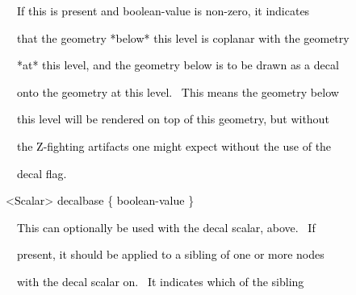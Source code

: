\documentclass[a4paper]{article}
\newcommand\textstyleOOoComputerKeyWord[1]{\textrm{\textcolor[rgb]{0.0,0.0,0.5019608}{#1}}}
\newcommand\textstyleOOoAssemblerSpecialChar[1]{\textrm{\textcolor[rgb]{0.0,0.5019608,0.0}{#1}}}
\newcommand\textstyleOOoAssemblerIdent[1]{\textrm{\textcolor{black}{#1}}}
\begin{document}
\bigskip

{\color{black}
\textstyleOOoComputerKeyWord{\textcolor{black}{\ \ \ \ If this is present and boolean-value is non-zero, it indicates}}}

{\color{black}
\textstyleOOoComputerKeyWord{\textcolor{black}{\ \ \ \ that the geometry *below* this level is coplanar with the
geometry}}}

{\color{black}
\textstyleOOoComputerKeyWord{\textcolor{black}{\ \ \ \ *at* this level, and the geometry below is to be drawn as a
decal}}}

{\color{black}
\textstyleOOoComputerKeyWord{\textcolor{black}{\ \ \ \ onto the geometry at this level. \ This means the geometry
below}}}

{\color{black}
\textstyleOOoComputerKeyWord{\textcolor{black}{\ \ \ \ this level will be rendered {\textquotedbl}on top
of{\textquotedbl} this geometry, but without}}}

{\color{black}
\textstyleOOoComputerKeyWord{\textcolor{black}{\ \ \ \ the Z-fighting artifacts one might expect without the use of
the}}}

{\color{black}
\textstyleOOoComputerKeyWord{\textcolor{black}{\ \ \ \ decal flag.}}}


\bigskip

{\color{black}
\textstyleOOoComputerKeyWord{\textcolor{black}{\ \ }}\textstyleOOoAssemblerSpecialChar{{\textless}}\textstyleOOoAssemblerIdent{Scalar}\textstyleOOoAssemblerSpecialChar{{\textgreater}}\textstyleOOoComputerKeyWord{\textcolor{black}{
}}\textstyleOOoAssemblerIdent{decalbase}\textstyleOOoComputerKeyWord{\textcolor{black}{
}}\textstyleOOoAssemblerSpecialChar{\{}\textstyleOOoComputerKeyWord{\textcolor{black}{
}}\textstyleOOoAssemblerIdent{boolean}\textstyleOOoAssemblerSpecialChar{{}-}\textstyleOOoAssemblerIdent{value}\textstyleOOoComputerKeyWord{\textcolor{black}{
}}\textstyleOOoAssemblerSpecialChar{\}}}


\bigskip

{\color{black}
\textstyleOOoComputerKeyWord{\textcolor{black}{\ \ \ \ This can optionally be used with the
{\textquotedbl}decal{\textquotedbl} scalar, above. \ If}}}

{\color{black}
\textstyleOOoComputerKeyWord{\textcolor{black}{\ \ \ \ present, it should be applied to a sibling of one or more
nodes}}}

{\color{black}
\textstyleOOoComputerKeyWord{\textcolor{black}{\ \ \ \ with the {\textquotedbl}decal{\textquotedbl} scalar on. \ It
indicates which of the sibling}}}
\end{document}
